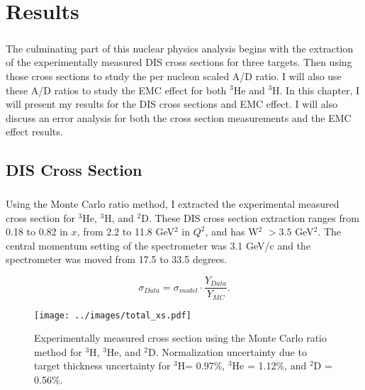 
\chapter{Results}
\paragraph{}The culminating part of this nuclear physics analysis begins with the extraction of the experimentally measured DIS cross sections for three targets. Then using those cross sections to study the per nucleon scaled A/D ratio. I will also use these A/D ratios to study the EMC effect for both $^3$He and $^3$H. In this chapter, I will present my results for the DIS cross sections and EMC effect. I will also discuss an error analysis for both the cross section measurements and the EMC effect results. 
\section{DIS Cross Section}
\paragraph{}Using the Monte Carlo ratio method, I extracted the experimental measured cross section for $^3$He, $^3$H, and $^2$D. These DIS cross section extraction ranges from 0.18 to 0.82 in $x$, from 2.2 to 11.8 GeV$^2$ in $Q^2$, and has W$^2$ $>3.5$ GeV$^2$. The central momentum setting of the spectrometer was 3.1 GeV/c and the spectrometer was moved from 17.5 to 33.5 degrees.


\begin{equation}
\sigma_{Data} = \sigma_{model} \cdot \frac{Y_{Data}}{Y_{MC}}. \nonumber
\end{equation}

\begin{figure}[t!]
	\hspace{-20pt}
	\texttt{[image: ../images/total\_xs.pdf]}
	\caption{Experimentally measured cross section using the Monte Carlo ratio method for $^3$H, $^3$He, and $^2$D. Normalization uncertainty due to target thickness uncertainty for $^3$H= 0.97\%, $^3$He = 1.12\%, and $^2$D = 0.56\%.}
    \label{CCplot}
\end{figure}

